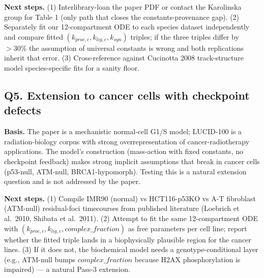 \textbf{Next steps.} (1) Interlibrary-loan the paper PDF or contact the Karolinska group for Table 1 (only path that closes the constants-provenance gap). (2) Separately fit our 12-compartment ODE to each species dataset independently and compare fitted $(k_{proc,c}, k_{lig,c}, k_{syn})$ triples; if the three triples differ by $>30\%$ the assumption of universal constants is wrong and both replications inherit that error. (3) Cross-reference against Cucinotta 2008 track-structure model species-specific fits for a sanity floor.

\subsection*{Q5. Extension to cancer cells with checkpoint defects}
\textbf{Basis.} The paper is a mechanistic normal-cell G1/S model; LUCID-100 is a radiation-biology corpus with strong overrepresentation of cancer-radiotherapy applications. The model's construction (mass-action with fixed constants, no checkpoint feedback) makes strong implicit assumptions that break in cancer cells (p53-null, ATM-null, BRCA1-hypomorph). Testing this is a natural extension question and is not addressed by the paper.

\textbf{Next steps.} (1) Compile IMR90 (normal) vs HCT116-p53KO vs A-T fibroblast (ATM-null) residual-foci timecourses from published literature (Loebrich et al.\ 2010, Shibata et al.\ 2011). (2) Attempt to fit the same 12-compartment ODE with $(k_{proc,c}, k_{lig,c}, complex\_fraction)$ as free parameters per cell line; report whether the fitted triple lands in a biophysically plausible region for the cancer lines. (3) If it does not, the biochemical model needs a genotype-conditional layer (e.g., ATM-null bumps $complex\_fraction$ because H2AX phosphorylation is impaired) --- a natural Pass-3 extension.
